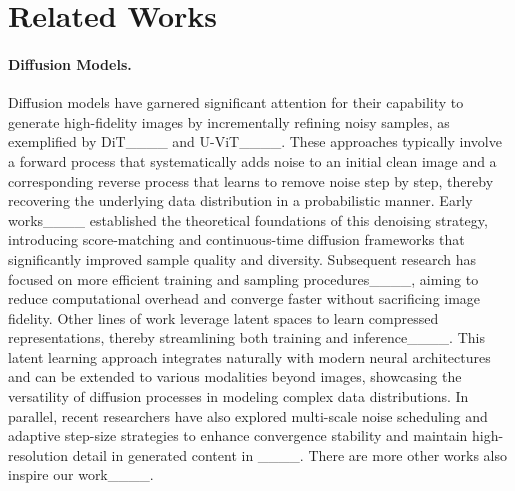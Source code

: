 \section{Related Works}
\paragraph{Diffusion Models.} Diffusion models have garnered significant attention for their capability to generate high-fidelity images by incrementally refining noisy samples, as exemplified by DiT____ and U-ViT____. These approaches typically involve a forward process that systematically adds noise to an initial clean image and a corresponding reverse process that learns to remove noise step by step, thereby recovering the underlying data distribution in a probabilistic manner. Early works____ established the theoretical foundations of this denoising strategy, introducing score-matching and continuous-time diffusion frameworks that significantly improved sample quality and diversity. Subsequent research has focused on more efficient training and sampling procedures____, aiming to reduce computational overhead and converge faster without sacrificing image fidelity. Other lines of work leverage latent spaces to learn compressed representations, thereby streamlining both training and inference____. This latent learning approach integrates naturally with modern neural architectures and can be extended to various modalities beyond images, showcasing the versatility of diffusion processes in modeling complex data distributions. In parallel, recent researchers have also explored multi-scale noise scheduling and adaptive step-size strategies to enhance convergence stability and maintain high-resolution detail in generated content in ____. There are more other works also inspire our work____.

